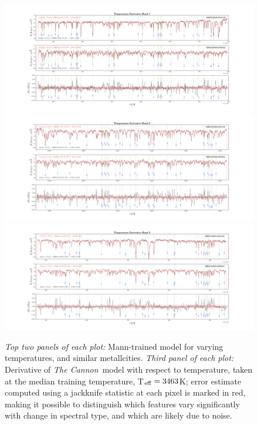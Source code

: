 \documentclass[modern]{aastex62}
\newcommand{\thecannon}{\textsl{The Cannon}}
\begin{document}
\begin{figure}[ht]
\begin{center}
\includegraphics[width=16cm]{figures/demo_derivatives_teff1.png}
\includegraphics[width=16cm]{figures/demo_derivatives_teff2.png}
\includegraphics[width=16cm]{figures/demo_derivatives_teff3.png}
\end{center}
\caption{\textit{Top two panels of each plot:} Mann-trained model for varying temperatures, and similar metallcities. \textit{Third panel of each plot:} Derivative of \thecannon\ model with respect to temperature, taken at the median training temperature, T$_{\rm eff}=3463$K; error estimate computed using a jackknife statistic at each pixel is marked in red, making it possible to distinguish which features vary significantly with change in spectral type, and which are likely due to noise.}\label{fig:demo_teff}
\end{figure}
\end{document}
